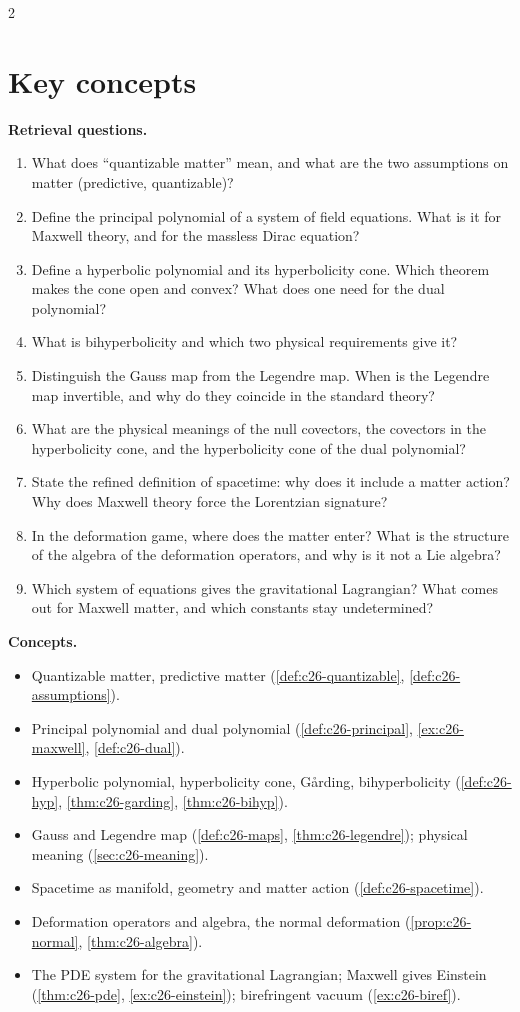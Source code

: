 \begin{paracol}{2}
\section*{Key concepts}
\begin{keyconcepts}
\textbf{Retrieval questions.}
\begin{enumerate}
  \item What does ``quantizable matter'' mean, and what are the two assumptions on matter (predictive, quantizable)?
  \item Define the principal polynomial of a system of field equations. What is it for Maxwell theory, and for the massless Dirac equation?
  \item Define a hyperbolic polynomial and its hyperbolicity cone. Which theorem makes the cone open and convex? What does one need for the dual polynomial?
  \item What is bihyperbolicity and which two physical requirements give it?
  \item Distinguish the Gauss map from the Legendre map. When is the Legendre map invertible, and why do they coincide in the standard theory?
  \item What are the physical meanings of the null covectors, the covectors in the hyperbolicity cone, and the hyperbolicity cone of the dual polynomial?
  \item State the refined definition of spacetime: why does it include a matter action? Why does Maxwell theory force the Lorentzian signature?
  \item In the deformation game, where does the matter enter? What is the structure of the algebra of the deformation operators, and why is it not a Lie algebra?
  \item Which system of equations gives the gravitational Lagrangian? What comes out for Maxwell matter, and which constants stay undetermined?
\end{enumerate}
\textbf{Concepts.}
\begin{itemize}
  \item Quantizable matter, predictive matter (\cref{def:c26-quantizable}, \cref{def:c26-assumptions}).
  \item Principal polynomial and dual polynomial (\cref{def:c26-principal}, \cref{ex:c26-maxwell}, \cref{def:c26-dual}).
  \item Hyperbolic polynomial, hyperbolicity cone, G{\aa}rding, bihyperbolicity (\cref{def:c26-hyp}, \cref{thm:c26-garding}, \cref{thm:c26-bihyp}).
  \item Gauss and Legendre map (\cref{def:c26-maps}, \cref{thm:c26-legendre}); physical meaning (\cref{sec:c26-meaning}).
  \item Spacetime as manifold, geometry and matter action (\cref{def:c26-spacetime}).
  \item Deformation operators and algebra, the normal deformation (\cref{prop:c26-normal}, \cref{thm:c26-algebra}).
  \item The PDE system for the gravitational Lagrangian; Maxwell gives Einstein (\cref{thm:c26-pde}, \cref{ex:c26-einstein}); birefringent vacuum (\cref{ex:c26-biref}).
\end{itemize}
\end{keyconcepts}

\flushside
\end{paracol}
